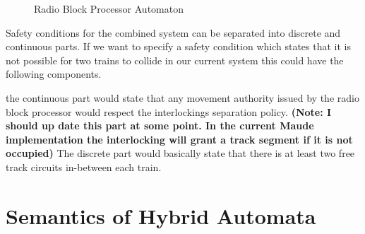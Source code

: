 \begin{figure} [H]
\begin{center}
\end{center}

\label{fig:RBCAuton}
\caption{Radio Block Processor Automaton}
\end{figure}


Safety conditions for the combined system can be separated into discrete and continuous parts.  If we want to specify a safety condition which states that it is not possible for two trains to collide in our current system this could have the following components. 

the continuous part would state that any movement authority issued by the radio block processor would respect the interlockings separation policy. \textbf{(Note: I should up date this part at some point. In the current Maude implementation the interlocking will grant a track segment if it is not occupied)} The discrete part would basically state that there is at least two free track circuits in-between each train.

\section{Semantics of Hybrid Automata} \label{sec:hyseman}

